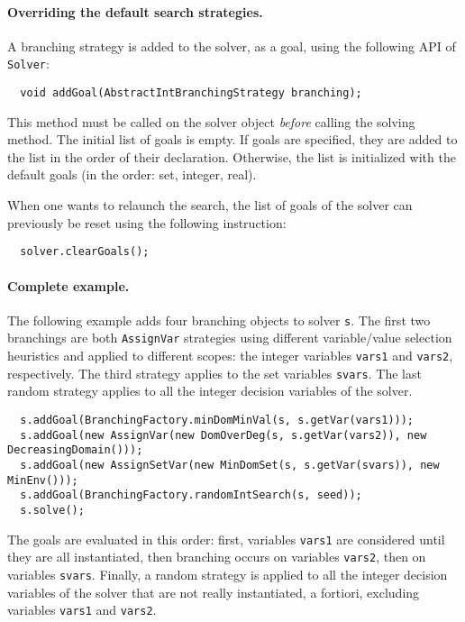 \paragraph{Overriding the default search strategies.}
A branching strategy is added to the solver, as a goal, using the following API of \texttt{Solver}:
\begin{lstlisting}
  void addGoal(AbstractIntBranchingStrategy branching);
\end{lstlisting}
This method must be called on the solver object \emph{before} calling the solving method.
The initial list of goals is empty. If goals are specified, they are added to the list in the order of their declaration.
Otherwise, the list is initialized with the default goals (in the order: set, integer, real).

When one wants to relaunch the search, the list of goals of the solver can previously be reset using the following instruction:
\begin{lstlisting}
  solver.clearGoals();
\end{lstlisting} 

\paragraph{Complete example.}
The following example adds four branching objects to solver \texttt{s}. 
The first two branchings are both \texttt{AssignVar} strategies using different variable/value selection heuristics and applied to different scopes: the integer variables \texttt{vars1} and \texttt{vars2}, respectively. The third strategy applies to the set variables \texttt{svars}. The last random strategy applies to all the integer decision variables of the solver.
\begin{lstlisting}
  s.addGoal(BranchingFactory.minDomMinVal(s, s.getVar(vars1)));
  s.addGoal(new AssignVar(new DomOverDeg(s, s.getVar(vars2)), new DecreasingDomain()));
  s.addGoal(new AssignSetVar(new MinDomSet(s, s.getVar(svars)), new MinEnv()));
  s.addGoal(BranchingFactory.randomIntSearch(s, seed));
  s.solve();
\end{lstlisting}
The goals are evaluated in this order: first, variables \texttt{vars1} are considered until they are all instantiated, then branching occurs on variables \texttt{vars2}, then on variables \texttt{svars}. Finally, a random strategy is applied to all the integer decision variables of the solver that are not really instantiated, a fortiori, excluding variables \texttt{vars1} and \texttt{vars2}.

